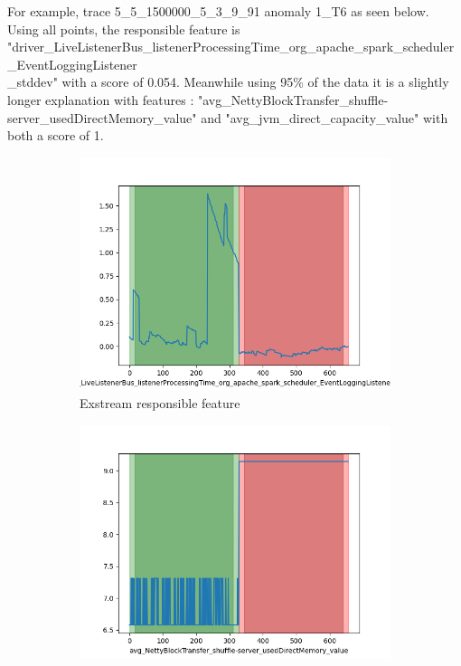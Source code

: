 \documentclass[oneside, a4paper, onecolumn, 11pt]{article}
\begin{document}
For example, trace 5\_5\_1500000\_5\_3\_9\_91 anomaly 1\_T6 as seen below. Using all points, the responsible feature is 
"driver\_LiveListenerBus\_listenerProcessingTime\_org\_apache\_spark\_scheduler\_EventLoggingListener\\\_stddev" with a score of 0.054. Meanwhile using 95\% of the data it is a slightly longer explanation with features : "avg\_NettyBlockTransfer\_shuffle-server\_usedDirectMemory\_value" and "avg\_jvm\_direct\_capacity\_value" with both a score of 1.\\

\begin{figure}[H]
  \centering
  \begin{subfigure}{0.3\textwidth}
      \centering
      \includegraphics[width=\linewidth]{images/ex_remove5bad.png}
      \caption{Exstream responsible feature}
  \end{subfigure}
  \hfill
  \begin{subfigure}{0.3\textwidth}
      \centering
      \includegraphics[width=\linewidth]{images/ex_remove5.png}

\end{subfigure}
\end{figure}
\end{document}
